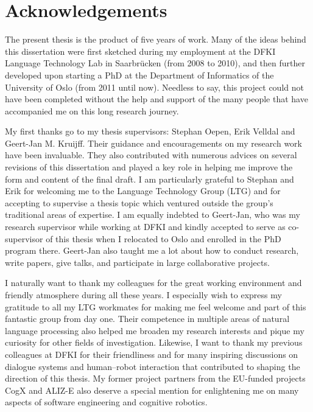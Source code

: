 \chapter*{Acknowledgements}

The present thesis is the product of five years of work. Many of the ideas behind this dissertation were first sketched during my employment at the DFKI Language Technology Lab in Saarbr\"ucken (from 2008 to 2010), and then further developed upon starting a PhD at the Department of Informatics of the University of Oslo (from 2011 until now).  Needless to say, this project could not have been completed without the help and support of the many people that have accompanied me on this long research journey.

My first thanks go to my thesis supervisors: Stephan Oepen, Erik Velldal and Geert-Jan M. Kruijff.  Their guidance and encouragements on my research work have been invaluable.  They also contributed with numerous advices on several revisions of this dissertation and played a key role in helping me improve the form and content of the final draft. I am particularly grateful to Stephan and Erik for welcoming me to the Language Technology Group (LTG) and for accepting to supervise a thesis topic which ventured outside the group's traditional areas of expertise. I am equally indebted to Geert-Jan, who was my research supervisor while working at DFKI and kindly accepted to serve as co-supervisor of this thesis when I relocated to Oslo and enrolled in the PhD program there. Geert-Jan  also taught me a lot about how to conduct research, write papers, give talks, and participate in large collaborative projects.

I naturally want to thank my colleagues for the great working environment and friendly atmosphere during all these years.  I especially wish to express my gratitude to all my LTG workmates for making me feel welcome and part of this fantastic group from day one. Their competence in multiple areas of natural language processing also helped me broaden my research interests and pique my curiosity for other fields of investigation.  Likewise, I want to thank my previous colleagues at DFKI for their friendliness and for many inspiring discussions on dialogue systems and human--robot interaction that contributed to shaping the direction of this thesis. My former project partners from the EU-funded projects CogX and ALIZ-E also deserve a special mention for enlightening me on many aspects of software engineering and cognitive robotics.


